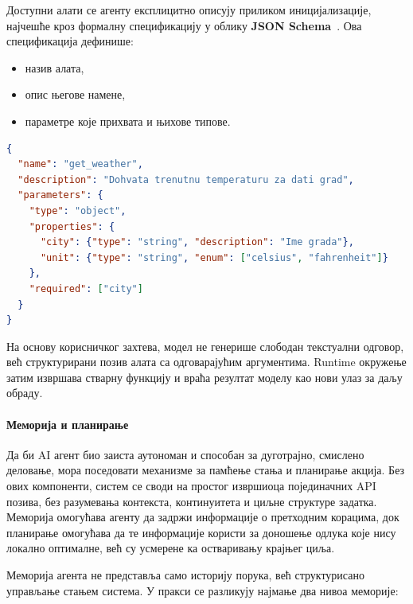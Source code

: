 Доступни алати се агенту експлицитно описују приликом иницијализације,
најчешће кроз формалну спецификацију у облику \textbf{JSON Schema}~\cite{openai2024toolcalling,patil2023gorilla}.
Ова спецификација дефинише:
\begin{itemize}
    \item назив алата,
    \item опис његове намене,
    \item параметре које прихвата и њихове типове.
\end{itemize}

\begin{lstlisting}[language=json, caption={Definicija alata koju agent "vidi"}]
{
  "name": "get_weather",
  "description": "Dohvata trenutnu temperaturu za dati grad",
  "parameters": {
    "type": "object",
    "properties": {
      "city": {"type": "string", "description": "Ime grada"},
      "unit": {"type": "string", "enum": ["celsius", "fahrenheit"]}
    },
    "required": ["city"]
  }
}
\end{lstlisting}

На основу корисничког захтева,
модел не генерише слободан текстуални одговор,
већ структурирани позив алата са одговарајућим аргументима.
Runtime окружење затим извршава стварну функцију
и враћа резултат моделу као нови улаз за даљу обраду.

\paragraph*{Меморија и планирање}

Да би AI агент био заиста аутономан и способан за дуготрајно, смислено деловање,
мора поседовати механизме за памћење стања и планирање акција.
Без ових компоненти, систем се своди на простог извршиоца појединачних API позива,
без разумевања контекста, континуитета и циљне структуре задатка.
Меморија омогућава агенту да задржи информације о претходним корацима,
док планирање омогућава да те информације користи за доношење одлука
које нису локално оптималне, већ су усмерене ка остваривању крајњег циља.

Меморија агента не представља само историју порука,
већ структурисано управљање стањем система.
У пракси се разликују најмање два нивоа меморије:


